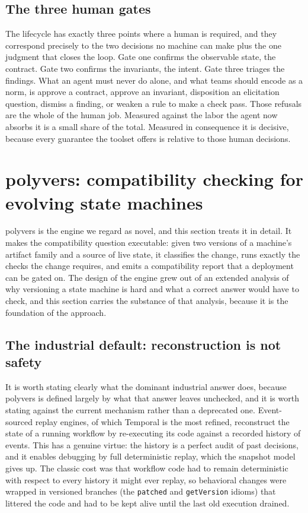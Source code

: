 \documentclass[11pt]{article}
\newcommand{\tool}[1]{\textsf{#1}}
\newcommand{\code}[1]{\texttt{#1}}
\begin{document}
\subsection{The three human gates}

The lifecycle has exactly three points where a human is required, and they
correspond precisely to the two decisions no machine can make plus the one
judgment that closes the loop. Gate one confirms the observable state, the
contract. Gate two confirms the invariants, the intent. Gate three triages the
findings. What an agent must never do alone, and what teams should encode as a
norm, is approve a contract, approve an invariant, disposition an elicitation
question, dismiss a finding, or weaken a rule to make a check pass. Those
refusals are the whole of the human job. Measured against the labor the agent
now absorbs it is a small share of the total.
Measured in consequence it is decisive, because every guarantee the toolset
offers is relative to those human decisions.

\section{\tool{polyvers}: compatibility checking for evolving state machines}

\tool{polyvers} is the engine we regard as novel, and this section treats it in
detail. It makes the compatibility question executable: given two versions of a
machine's artifact family and a source of live state, it classifies the change,
runs exactly the checks the change requires, and emits a compatibility report
that a deployment can be gated on. The design of the engine grew out of an
extended analysis of why versioning a state machine is hard and what a correct
answer would have to check, and this section carries the substance of that
analysis, because it is the foundation of the approach.

\subsection{The industrial default: reconstruction is not safety}

It is worth stating clearly what the dominant industrial answer does, because
\tool{polyvers} is defined largely by what that answer leaves unchecked, and it
is worth stating against the current mechanism rather than a deprecated one.
Event-sourced replay engines, of which Temporal is the most refined,
reconstruct the state of a running workflow by re-executing its code against a
recorded history of events. This has a genuine virtue: the history is a perfect
audit of past decisions, and it enables debugging by full deterministic replay,
which the snapshot model gives up. The classic cost was that workflow code had
to remain deterministic with respect to every history it might ever replay, so
behavioral changes were wrapped in versioned branches (the \code{patched} and
\code{getVersion} idioms) that littered the code and had to be kept alive until
the last old execution drained.
\end{document}
